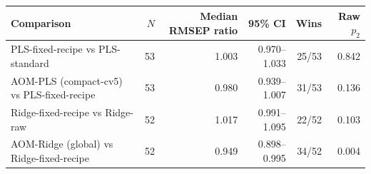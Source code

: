 \begin{tabularx}{\linewidth}{Xrrrrr}
\toprule
Comparison & $N$ & Median RMSEP ratio & 95\% CI & Wins & Raw $p_2$ \\
\midrule
PLS-\allowbreak{}fixed-\allowbreak{}recipe vs PLS-\allowbreak{}standard & 53 & 1.003 & 0.970--1.033 & 25/53 & 0.842 \\
AOM-\allowbreak{}PLS (compact-\allowbreak{}cv5) vs PLS-\allowbreak{}fixed-\allowbreak{}recipe & 53 & 0.980 & 0.939--1.007 & 31/53 & 0.136 \\
Ridge-\allowbreak{}fixed-\allowbreak{}recipe vs Ridge-\allowbreak{}raw & 52 & 1.017 & 0.991--1.095 & 22/52 & 0.103 \\
AOM-\allowbreak{}Ridge (global) vs Ridge-\allowbreak{}fixed-\allowbreak{}recipe & 52 & 0.949 & 0.898--0.995 & 34/52 & 0.004 \\
\bottomrule
\end{tabularx}
